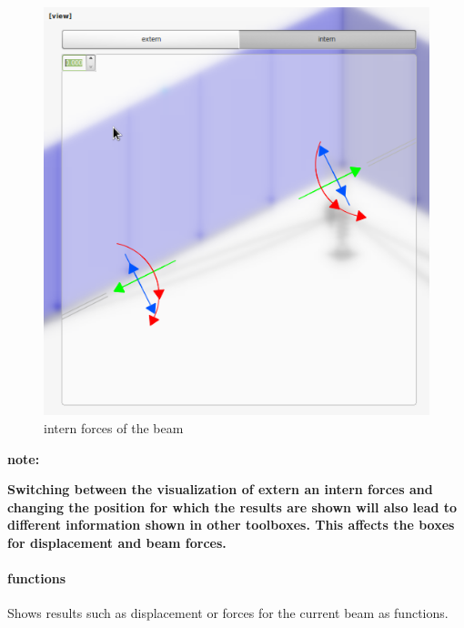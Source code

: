 \documentclass[a4paper,11pt]{report}
\begin{document}
\begin{minipage}[h]{0.5\textwidth-0.5cm}
\begin{figure}[H]
\begin{center}
\includegraphics[width=\textwidth]{../pictures/internforcesdetail.png}
\caption{intern forces of the beam}
\label{pic:internforces}
\end{center}
\end{figure}
\end{minipage}

\textbf{note:}
\begin{center}
\textbf{Switching between the visualization of extern an intern forces and changing the position for which the results are shown will also lead to different information shown in other toolboxes. This affects the boxes for displacement and beam forces.}
\end{center}


\paragraph{functions}
Shows results such as displacement or forces for the current beam as functions.\\
\end{document}
